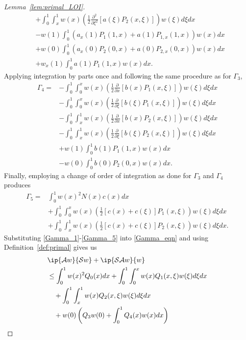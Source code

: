 \documentclass[US letter, 9 pt, conference]{ieeeconf}  \usepackage{setspace}
\newcommand{\pfx}{\frac{\partial}{\partial x}}
\newcommand{\igzo}{\int_0^1}
\newcommand{\igzx}{\int_0^x}
\newcommand{\igxo}{\int_x^1}
\newcommand{\hlf}{\frac{1}{2}}
\begin{document}
\begin{proof}[Lemma~\ref{lem:primal_LOI}]
\begin{align}
 & +\igzo \igxo w(x) \left(\hlf \frac{\partial^2}{\partial \xi^2}\left[a(\xi)P_2(x,\xi) \right] \right) w(\xi) d\xi dx \nonumber \\
 &  - w(1) \igzo \left(a_x(1)P_1(1,x)+a(1)P_{1,x}(1,x) \right) w(x) dx \nonumber \\
 & + w(0) \igzo \left(a_x(0)P_2(0,x)+a(0)P_{2,x}(0,x) \right)w(x)dx \nonumber \\
 &\label{Gamma_3}   + w_x(1) \igzo a(1)P_1(1,x) w(x)dx.
 \end{align}
  Applying integration by parts once and following the same procedure as for $\Gamma_3$,
 \begin{align}
 \Gamma_4 =&- \igzo \igzx w(x) \left(\hlf \pfx \left[b(x)P_1(x,\xi)\right]\right)w(\xi)d\xi dx \nonumber \\
 &- \igzo \igzx w(x)\left(\hlf \frac{\partial}{\partial \xi}\left[ b(\xi)P_1(x,\xi)\right] \right) w(\xi) d\xi dx  \nonumber \\
 & - \igzo \igxo w(x) \left(\hlf \pfx \left[b(x)P_2(x,\xi) \right]\right)w(\xi)d\xi dx \nonumber \\
 &- \igzo \igxo w(x)\left(\hlf \frac{\partial}{\partial \xi} \left[b(\xi)P_2(x,\xi) \right] \right) w(\xi) d\xi dx \nonumber \\
 &  + w(1) \igzo b(1)P_1(1,x)w(x)dx \nonumber \\
 &\label{Gamma_4} -w(0)\igzo b(0)P_2(0,x)w(x)dx.
 \end{align} 
Finally, employing a change of order of integration as done for $\Gamma_3$ and $\Gamma_4$ produces
 \begin{align}
 \Gamma_5 = & \igzo w(x)^2 N(x) c(x) dx \nonumber \\
 &+ \igzo \igzx w(x) \left(\hlf \left[c(x)+c(\xi) \right] P_1(x,\xi) \right) w(\xi) d\xi dx \nonumber \\
 &\label{Gamma_5} + \igzo \igxo w(x) \left( \hlf \left[c(x)+c(\xi)\right] P_2(x,\xi)\right)w(\xi) d\xi dx.
 \end{align}
 Substituting \eqref{Gamma_1}-\eqref{Gamma_5} into \eqref{Gamma_eqn} and using Definition~\ref{def:primal} gives us
 \begin{align*}
 &\ip{\mathcal{A}w}{\mathcal{S}w}+\ip{\mathcal{S}\mathcal{A}w}{w} \\
 &\leq  \igzo w(x)^2 Q_0(x)dx + \igzo \igzx w(x)Q_1(x,\xi)w(\xi)d\xi dx\\
 & \quad  + \igzo \igxo w(x)Q_2(x,\xi)w(\xi)d\xi dx \\
 & \quad + w(0) \left(Q_3 w(0) + \igzo Q_4(x)w(x)dx \right) \\

\end{align*}
\end{proof}
\end{document}
